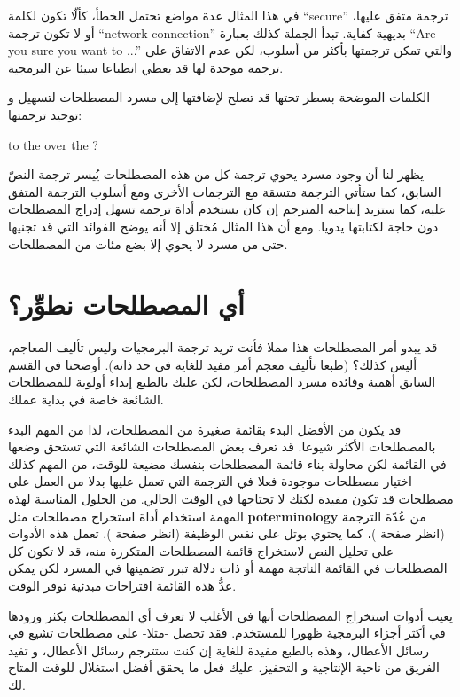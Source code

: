 في هذا المثال عدة مواضع تحتمل الخطأ، كألّا تكون لكلمة “secure” ترجمة
متفق عليها، أو لا تكون ترجمة “network connection” بديهية كفاية. تبدأ
الجملة كذلك بعبارة “Are you sure you want to ...” والتي تمكن ترجمتها
بأكثر من أسلوب، لكن عدم الاتفاق على ترجمة موحدة لها قد يعطي انطباعا
سيئا عن البرمجية.

الكلمات الموضحة بسطر تحتها قد تصلح لإضافتها إلى مسرد المصطلحات لتسهيل و
توحيد ترجمتها:

 to  the
 over the  ?

يظهر لنا أن وجود مسرد يحوي ترجمة كل من هذه المصطلحات يُيسر ترجمة النصّ
السابق، كما ستأتي الترجمة متسقة مع الترجمات الأخرى ومع أسلوب الترجمة
المتفق عليه، كما ستزيد إنتاجية المترجم إن كان يستخدم أداة ترجمة تسهل
إدراج المصطلحات دون حاجة لكتابتها يدويا. ومع أن هذا المثال مُختلق إلا
أنه يوضح الفوائد التي قد تجنيها حتى من مسرد لا يحوي إلا بضع مئات من
المصطلحات.

\section{أي المصطلحات نطوِّر؟}
قد يبدو أمر المصطلحات هذا مملا فأنت تريد ترجمة البرمجيات وليس تأليف
المعاجم، أليس كذلك؟ (طبعا تأليف معجم أمر مفيد للغاية في حد ذاته).
أوضحنا في القسم السابق أهمية وفائدة مسرد المصطلحات، لكن عليك بالطبع
إبداء أولوية للمصطلحات الشائعة خاصة في بداية عملك.

قد يكون من الأفضل البدء بقائمة صغيرة من المصطلحات، لذا من المهم البدء
بالمصطلحات الأكثر شيوعا. قد تعرف بعض المصطلحات الشائعة التي تستحق وضعها
في القائمة لكن محاولة بناء قائمة المصطلحات بنفسك مضيعة للوقت، من المهم
كذلك اختيار مصطلحات موجودة فعلا في الترجمة التي تعمل عليها بدلا من
العمل على مصطلحات قد تكون مفيدة لكنك لا تحتاجها في الوقت الحالي. من
الحلول المناسبة لهذه المهمة استخدام أداة استخراج مصطلحات مثل {\bf
poterminology} من عُدّة الترجمة (انظر صفحة
)، كما يحتوي بوتل على نفس الوظيفة (انظر صفحة
). تعمل هذه الأدوات على تحليل النص لاستخراج
قائمة المصطلحات المتكررة منه، قد لا تكون كل المصطلحات في القائمة
الناتجة مهمة أو ذات دلالة تبرر تضمينها في المسرد لكن يمكن عدُّ هذه
القائمة اقتراحات مبدئية توفر الوقت.

يعيب أدوات استخراج المصطلحات أنها في الأغلب لا تعرف أي المصطلحات يكثر
ورودها في أكثر أجزاء البرمجية ظهورا للمستخدم. فقد تحصل -مثلا- على
مصطلحات تشيع في رسائل الأعطال، وهذه بالطبع مفيدة للغاية إن كنت ستترجم
رسائل الأعطال، و تفيد الفريق من ناحية الإنتاجية و التحفيز. عليك فعل ما
يحقق أفضل استغلال للوقت المتاح لك.

